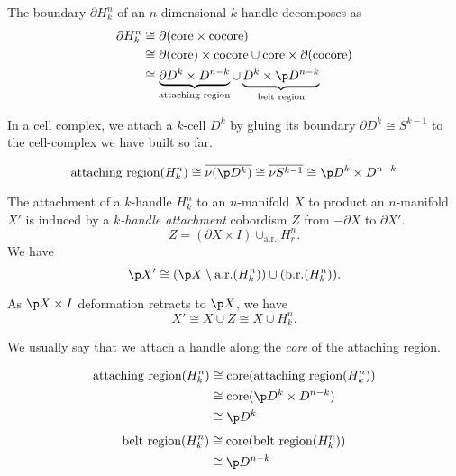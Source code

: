 \documentclass[a4paper]{article}
\renewcommand{\boundary}{\partial}
\renewcommand{\b}{\boundary}
\begin{document}
\begin{definition}
  The boundary \(\b H^n_k\) of an \(n\)-dimensional \(k\)-handle decomposes as
  \begin{align*}
    \b H^n_k
    &\cong \b(\text{core} \times \text{cocore}) \\
    &\cong \b(\text{core}) \times \text{cocore} \cup \text{core} \times \b(\text{cocore}) \\
    &\cong \underbrace{\b D^k \times D^{n - k}}_{\text{attaching region}} \cup \underbrace{D^k \times \p D^{n - k}}_{\text{belt region}}
  \end{align*}
\end{definition}

In a cell complex, we attach a \(k\)-cell \(D^k\) by gluing its boundary \(\b D^k \cong S^{k - 1}\) to the cell-complex we have built so far.

\[
  \text{attaching region} (H^n_k)
  \cong \overline{\nu(\p D^k)}
  \cong \overline{\nu S^{k - 1}}
  \cong \p D^k \times D^{n - k}
\]

\begin{definition}
  The attachment of a \(k\)-handle \(H^n_k\) to an \(n\)-manifold \(X\) to product an \(n\)-manifold \(X'\) is induced by a \emph{\(k\)-handle attachment} cobordism \(Z\) from \(- \b X\) to \(\b X'\).
  \[
    Z = (\b X \times I) \cup_{\text{a.r.}} H^n_r.
  \]
  We have
  \[
    \p X' \cong (\p X \setminus \text{a.r.} (H^n_k)) \cup (\text{b.r.} (H^n_k)).
  \]
\end{definition}

As \(\p X \times I\) deformation retracts to \(\p X\), we have
\[
  X' \cong X \cup Z \cong X \cup H^n_k.
\]

\begin{convention}
  We usually say that we attach a handle along the \emph{core} of the attaching region.
\end{convention}

\begin{definition}
  \begin{align*}
    \text{attaching region} (H^n_k)
    &\cong \text{core}(\text{attaching region}(H^n_k)) \\
    &\cong \text{core}(\p D^k \times D^{n - k}) \\
    &\cong \p D^k
  \end{align*}
  \begin{align*}
    \text{belt region} (H^n_k)
    &\cong \text{core}(\text{belt region}(H^n_k)) \\
    &\cong \p D^{n - k}
  \end{align*}
\end{definition}
\end{document}
